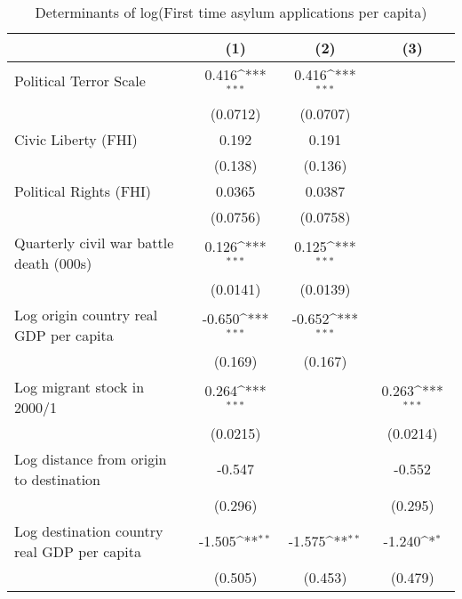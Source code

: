 \begin{table}[htbp]\centering
\def\sym#1{\ifmmode^{#1}\else\(^{#1}\)\fi}
\caption{Determinants of log(First time asylum applications per capita)}
\begin{tabular}{l*{3}{c}}
\hline\hline
                    &\multicolumn{1}{c}{(1)}         &\multicolumn{1}{c}{(2)}         &\multicolumn{1}{c}{(3)}         \\
\hline
Political Terror Scale&       0.416\sym{***}&       0.416\sym{***}&                     \\
                    &    (0.0712)         &    (0.0707)         &                     \\
[1em]
Civic Liberty (FHI) &       0.192         &       0.191         &                     \\
                    &     (0.138)         &     (0.136)         &                     \\
[1em]
Political Rights (FHI)&      0.0365         &      0.0387         &                     \\
                    &    (0.0756)         &    (0.0758)         &                     \\
[1em]
Quarterly civil war battle death (000s)&       0.126\sym{***}&       0.125\sym{***}&                     \\
                    &    (0.0141)         &    (0.0139)         &                     \\
[1em]
Log origin country real GDP per capita&      -0.650\sym{***}&      -0.652\sym{***}&                     \\
                    &     (0.169)         &     (0.167)         &                     \\
[1em]
Log migrant stock in 2000/1&       0.264\sym{***}&                     &       0.263\sym{***}\\
                    &    (0.0215)         &                     &    (0.0214)         \\
[1em]
Log distance from origin to destination&      -0.547         &                     &      -0.552         \\
                    &     (0.296)         &                     &     (0.295)         \\
[1em]
Log destination country real GDP per capita&      -1.505\sym{**} &      -1.575\sym{**} &      -1.240\sym{*}  \\
                    &     (0.505)         &     (0.453)         &     (0.479)         \\

\end{tabular}
\end{table}
